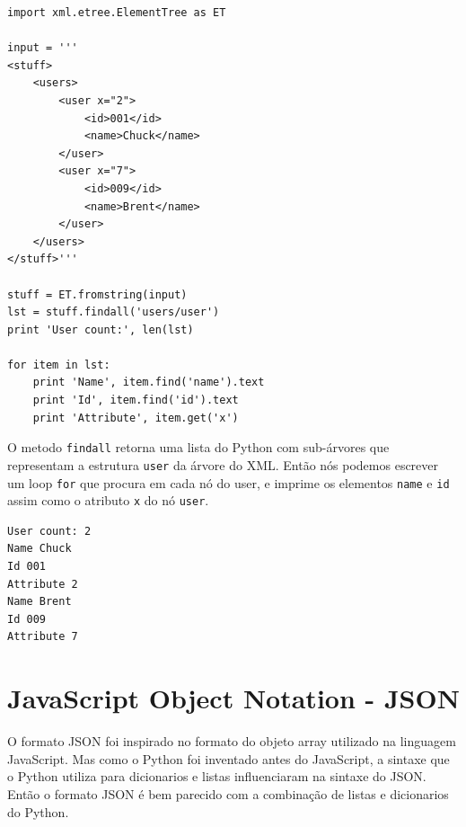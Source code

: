 \beforeverb
\begin{verbatim}
import xml.etree.ElementTree as ET

input = '''
<stuff>
    <users>
        <user x="2">
            <id>001</id>
            <name>Chuck</name>
        </user>
        <user x="7">
            <id>009</id>
            <name>Brent</name>
        </user>
    </users>
</stuff>'''

stuff = ET.fromstring(input)
lst = stuff.findall('users/user')
print 'User count:', len(lst)

for item in lst:
    print 'Name', item.find('name').text
    print 'Id', item.find('id').text
    print 'Attribute', item.get('x')
\end{verbatim}
\afterverb
%
O metodo {\tt findall} retorna uma lista do Python com sub-árvores
que representam a estrutura {\tt user} da árvore do XML. Então nós 
podemos escrever um loop {\tt for} que procura em cada nó do user,
e imprime os elementos {\tt name} e {\tt id} assim como o 
atributo {\tt x} do nó {\tt user}.

\beforeverb
\begin{verbatim}
User count: 2
Name Chuck
Id 001
Attribute 2
Name Brent
Id 009
Attribute 7
\end{verbatim}
\afterverb
%

\section{JavaScript Object Notation - JSON}

O formato JSON foi inspirado no formato do objeto array utilizado na linguagem JavaScript.
Mas como o Python foi inventado antes do JavaScript, a sintaxe que o Python utiliza
para dicionarios e listas influenciaram na sintaxe do JSON. Então o formato JSON é
bem parecido com a combinação de listas e dicionarios do Python.

